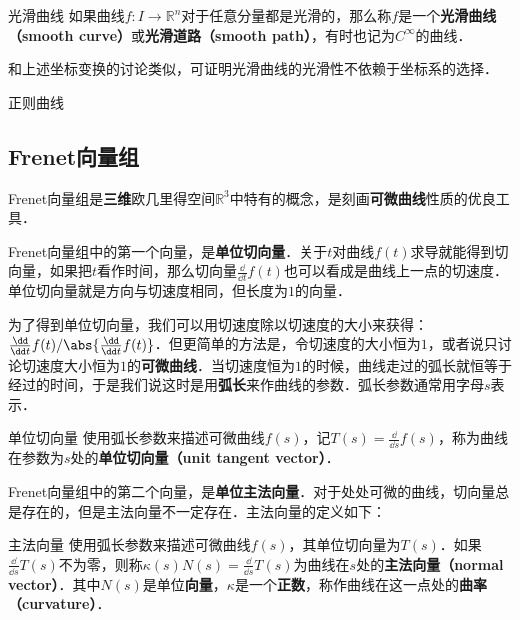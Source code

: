 \begin{definition}{光滑曲线}
如果曲线$f:I\to\mathbb{R}^n$对于任意分量都是光滑的，那么称$f$是一个\textbf{光滑曲线（smooth curve）}或\textbf{光滑道路（smooth path）}，有时也记为$C^\infty$的曲线．
\end{definition}

和上述坐标变换的讨论类似，可证明光滑曲线的光滑性不依赖于坐标系的选择．

\begin{definition}{正则曲线}

\end{definition}

\subsection{Frenet向量组}

Frenet向量组是\textbf{三维}欧几里得空间$\mathbb{R}^3$中特有的概念，是刻画\textbf{可微曲线}性质的优良工具．

Frenet向量组中的第一个向量，是\textbf{单位切向量}．关于$t$对曲线$f(t)$求导就能得到切向量，如果把$t$看作时间，那么切向量$\frac{\dd}{\dd t}f(t)$也可以看成是曲线上一点的切速度．单位切向量就是方向与切速度相同，但长度为$1$的向量．

为了得到单位切向量，我们可以用切速度除以切速度的大小来获得：$\frac{\dd}{\dd t}f(t)/\abs{\frac{\dd}{\dd t}f(t)}$．但更简单的方法是，令切速度的大小恒为$1$，或者说只讨论切速度大小恒为$1$的\textbf{可微曲线}．当切速度恒为$1$的时候，曲线走过的弧长就恒等于经过的时间，于是我们说这时是用\textbf{弧长}来作曲线的参数．弧长参数通常用字母$s$表示．

\begin{definition}{单位切向量}\label{Curv3D_def1}
使用弧长参数来描述可微曲线$f(s)$，记$T(s)=\frac{\dd}{\dd s}f(s)$，称为曲线在参数为$s$处的\textbf{单位切向量（unit tangent vector）}．
\end{definition}

Frenet向量组中的第二个向量，是\textbf{单位主法向量}．对于处处可微的曲线，切向量总是存在的，但是主法向量不一定存在．主法向量的定义如下：

\begin{definition}{主法向量}\label{Curv3D_def2}
使用弧长参数来描述可微曲线$f(s)$，其单位切向量为$T(s)$．如果$\frac{\dd}{\dd s}T(s)$不为零，则称$\kappa(s) N(s)=\frac{\dd}{\dd s}T(s)$为曲线在$s$处的\textbf{主法向量（normal vector）}．其中$N(s)$是单位\textbf{向量}，$\kappa$是一个\textbf{正数}，称作曲线在这一点处的\textbf{曲率（curvature）}．
\end{definition}

